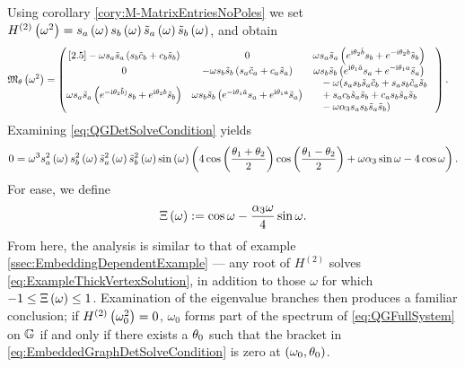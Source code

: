 Using corollary \ref{cory:M-MatrixEntriesNoPoles} we set $H^{(2)}\left( \omega^2 \right) = s_a\left( \omega \right) s_b\left( \omega \right) \tilde{s}_a\left( \omega \right) \tilde{s}_b\left( \omega \right)$, and obtain
\begin{align*}
	\mathfrak{M}_{\theta}\left( \omega^2 \right) &=
	\begin{pmatrix}[2.5]
		-\omega s_a \tilde{s}_a \left(  s_b \tilde{c}_b + c_b \tilde{s}_b  \right) &
		0 &
		\begin{split}
			&\omega s_a \tilde{s}_a \left(  e^{\mathrm{i}\theta_2\tilde{b}}s_b + e^{-\mathrm{i}\theta_2 b}\tilde{s}_b  \right)
		\end{split} \\
		0 &
		-\omega s_b \tilde{s}_b \left(  s_a \tilde{c}_a + c_a \tilde{s}_a  \right) &
		\begin{split}
			&\omega s_b \tilde{s}_b \left(  e^{\mathrm{i}\theta_1\tilde{a}}s_a + e^{-\mathrm{i}\theta_1 a}\tilde{s}_a  \right) 
		\end{split} \\
		\omega s_a \tilde{s}_a \left(  e^{-\mathrm{i}\theta_2\tilde{b})}s_b + e^{\mathrm{i}\theta_2 b}\tilde{s}_b  \right) &
		\omega s_b \tilde{s}_b \left(  e^{-\mathrm{i}\theta_1\tilde{a}}s_a + e^{\mathrm{i}\theta_1 a}\tilde{s}_a  \right) &
		\begin{split}
			&-\omega ( s_a s_b \tilde{s}_a \tilde{c}_b 
			+ s_a s_b \tilde{c}_a \tilde{s}_b \\ 
			& + s_a c_b \tilde{s}_a \tilde{s}_b
			+ c_a s_b \tilde{s}_a \tilde{s}_b \\
			& - \omega\alpha_3 s_a s_b \tilde{s}_a \tilde{s}_b )
		\end{split}
	\end{pmatrix}.
\end{align*}
Examining \eqref{eq:QGDetSolveCondition} yields
\begin{align} \label{eq:ExampleThickVertexSolution}
	0 = \omega^3 s_a^2\left( \omega \right) s_b^2\left( \omega \right) \tilde{s}_a^2\left( \omega \right) \tilde{s}_b^2\left( \omega \right) \sin\left( \omega \right) 
	\left(  4\cos\left( \frac{\theta_1+\theta_2}{2} \right)\cos\left( \frac{\theta_1-\theta_2}{2} \right) + \omega\alpha_3\sin\omega - 4\cos\omega \right).
\end{align}
For ease, we define
\begin{align*}
	\Xi\left( \omega \right) := \cos\omega - \frac{\alpha_3\omega}{4}\sin\omega.
\end{align*}
From here, the analysis is similar to that of example \ref{ssec:EmbeddingDependentExample} --- any root of $H^{(2)}$ solves \eqref{eq:ExampleThickVertexSolution}, in addition to those $\omega$ for which $-1\leq\Xi\left( \omega \right)\leq 1$.
Examination of the eigenvalue branches then produces a familiar conclusion; if $H^{(2)}\left( \omega_0^2 \right)=0$, $\omega_0$ forms part of the spectrum of \eqref{eq:QGFullSystem} on $\mathbb{G}$ if and only if there exists a $\theta_0$ such that the bracket in \eqref{eq:EmbeddedGraphDetSolveCondition} is zero at $\left( \omega_0,\theta_0 \right)$.
